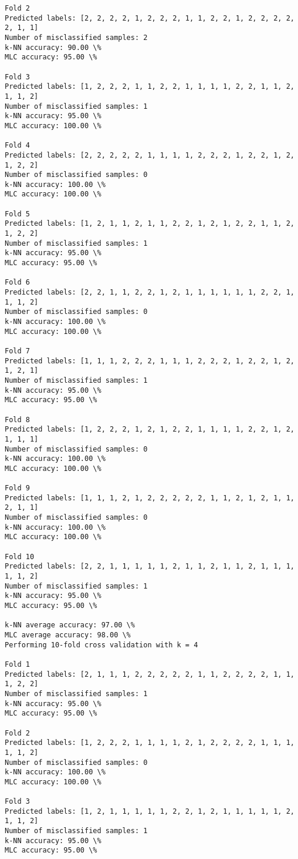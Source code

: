 \documentclass[11pt]{article}
\begin{document}
\begin{Verbatim}[commandchars=\\\{\}]
Fold 2
Predicted labels: [2, 2, 2, 2, 1, 2, 2, 2, 1, 1, 2, 2, 1, 2, 2, 2, 2, 2, 1, 1]
Number of misclassified samples: 2
k-NN accuracy: 90.00 \%
MLC accuracy: 95.00 \%

Fold 3
Predicted labels: [1, 2, 2, 2, 1, 1, 2, 2, 1, 1, 1, 1, 2, 2, 1, 1, 2, 1, 1, 2]
Number of misclassified samples: 1
k-NN accuracy: 95.00 \%
MLC accuracy: 100.00 \%

Fold 4
Predicted labels: [2, 2, 2, 2, 2, 1, 1, 1, 1, 2, 2, 2, 1, 2, 2, 1, 2, 1, 2, 2]
Number of misclassified samples: 0
k-NN accuracy: 100.00 \%
MLC accuracy: 100.00 \%

Fold 5
Predicted labels: [1, 2, 1, 1, 2, 1, 1, 2, 2, 1, 2, 1, 2, 2, 1, 1, 2, 1, 2, 2]
Number of misclassified samples: 1
k-NN accuracy: 95.00 \%
MLC accuracy: 95.00 \%

Fold 6
Predicted labels: [2, 2, 1, 1, 2, 2, 1, 2, 1, 1, 1, 1, 1, 1, 2, 2, 1, 1, 1, 2]
Number of misclassified samples: 0
k-NN accuracy: 100.00 \%
MLC accuracy: 100.00 \%

Fold 7
Predicted labels: [1, 1, 1, 2, 2, 2, 1, 1, 1, 2, 2, 2, 1, 2, 2, 1, 2, 1, 2, 1]
Number of misclassified samples: 1
k-NN accuracy: 95.00 \%
MLC accuracy: 95.00 \%

Fold 8
Predicted labels: [1, 2, 2, 2, 1, 2, 1, 2, 2, 1, 1, 1, 1, 2, 2, 1, 2, 1, 1, 1]
Number of misclassified samples: 0
k-NN accuracy: 100.00 \%
MLC accuracy: 100.00 \%

Fold 9
Predicted labels: [1, 1, 1, 2, 1, 2, 2, 2, 2, 2, 1, 1, 2, 1, 2, 1, 1, 2, 1, 1]
Number of misclassified samples: 0
k-NN accuracy: 100.00 \%
MLC accuracy: 100.00 \%

Fold 10
Predicted labels: [2, 2, 1, 1, 1, 1, 1, 2, 1, 1, 2, 1, 1, 2, 1, 1, 1, 1, 1, 2]
Number of misclassified samples: 1
k-NN accuracy: 95.00 \%
MLC accuracy: 95.00 \%

k-NN average accuracy: 97.00 \%
MLC average accuracy: 98.00 \%
Performing 10-fold cross validation with k = 4

Fold 1
Predicted labels: [2, 1, 1, 1, 2, 2, 2, 2, 2, 1, 1, 2, 2, 2, 2, 1, 1, 1, 2, 2]
Number of misclassified samples: 1
k-NN accuracy: 95.00 \%
MLC accuracy: 95.00 \%

Fold 2
Predicted labels: [1, 2, 2, 2, 1, 1, 1, 1, 2, 1, 2, 2, 2, 2, 1, 1, 1, 1, 1, 2]
Number of misclassified samples: 0
k-NN accuracy: 100.00 \%
MLC accuracy: 100.00 \%

Fold 3
Predicted labels: [1, 2, 1, 1, 1, 1, 1, 2, 2, 1, 2, 1, 1, 1, 1, 1, 2, 1, 1, 2]
Number of misclassified samples: 1
k-NN accuracy: 95.00 \%
MLC accuracy: 95.00 \%


\end{Verbatim}
\end{document}
